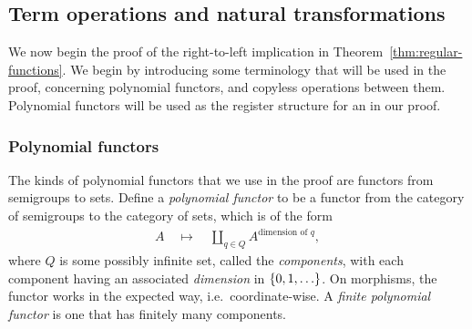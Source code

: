 

\subsection{Term operations and natural transformations}
We now begin the proof of the right-to-left implication in Theorem~\ref{thm:regular-functions}. We begin by introducing some terminology that will be used in the proof, concerning  polynomial functors, and copyless operations between them. Polynomial functors will be used as the register structure for an \sst in our proof. 

\subsubsection{Polynomial functors}
The kinds of polynomial functors that we use in the proof are functors from semigroups to sets.
Define a \emph{polynomial functor} to be a functor from the category of semigroups to the category of sets, which is of the form
\begin{align*}
A \quad \mapsto \quad \coprod_{q \in Q} A^{\text{dimension of } q},
\end{align*}
where $Q$ is some possibly infinite set, called the \emph{components}, with each  component having an associated \emph{dimension} in $\{0,1,\ldots\}$. On morphisms, the functor works in the expected way, i.e.~coordinate-wise.  A \emph{finite polynomial functor} is one that has finitely many components. 

